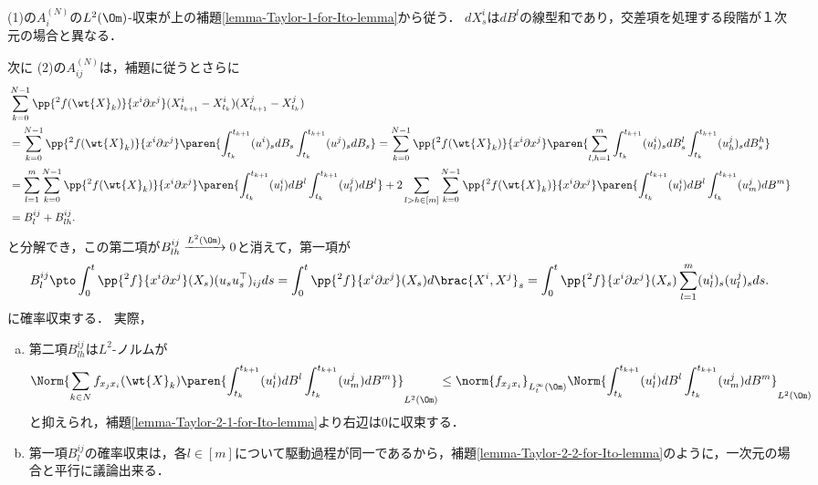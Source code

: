 \documentclass[uplatex,dvipdfmx]{jsreport}
\begin{document}
\begin{Proof}
\begin{description}
\begin{enumerate}
        \end{enumerate}
        \item[(1)の証明]
        (1)の$A^{(N)}_i$の$L^2(\Om)$-収束が上の補題\ref{lemma-Taylor-1-for-Ito-lemma}から従う．
        $dX_s^i$は$dB^l$の線型和であり，交差項を処理する段階が１次元の場合と異なる．
        \item[(2)の証明]
        次に
        (2)の$A^{(N)}_{ij}$は，補題に従うとさらに
        \begin{align*}
            &\sum_{k=0}^{N-1}\pp{^2f(\wt{X}_k)}{x^i\partial x^j}(X_{t_{k+1}}^i-X_{t_k}^i)(X_{t_{k+1}}^j-X_{t_k}^j)\\
            &=\sum_{k=0}^{N-1}\pp{^2f(\wt{X}_k)}{x^i\partial x^j}\paren{\int^{t_{k+1}}_{t_k}(u^i)_sdB_s\int^{t_{k+1}}_{t_k}(u^j)_sdB_s}
            =\sum_{k=0}^{N-1}\pp{^2f(\wt{X}_k)}{x^i\partial x^j}\paren{\sum_{l,h=1}^m\int^{t_{k+1}}_{t_k}(u^i_l)_sdB_s^l\int^{t_{k+1}}_{t_k}(u_h^j)_sdB_s^h}\\
            &=\sum_{l=1}^m\sum_{k=0}^{N-1}\pp{^2f(\wt{X}_k)}{x^i\partial x^j}\paren{\int^{t_{k+1}}_{t_k}(u_l^i)dB^l\int^{t_{k+1}}_{t_k}(u_l^j)dB^l}+2\sum_{l>h\in[m]}\sum_{k=0}^{N-1}\pp{^2f(\wt{X}_k)}{x^i\partial x^j}\paren{\int^{t_{k+1}}_{t_k}(u_l^i)dB^l\int^{t_{k+1}}_{t_k}(u_m^j)dB^m}\\
            &=B^{ij}_{l}+B^{ij}_{lh}.
        \end{align*}
        と分解でき，この第二項が$B^{ij}_{lh}\xrightarrow{L^2(\Om)}0$と消えて，第一項が
        \[B^{ij}_l\pto\int^t_0\pp{^2f}{x^i\partial x^j}(X_s)(u_su_s^\top)_{ij}ds=\int^t_0\pp{^2f}{x^i\partial x^j}(X_s)d\brac{X^i,X^j}_s=\int^t_0\pp{^2f}{x^i\partial x^j}(X_s)\sum_{l=1}^m(u^i_l)_s(u^j_l)_sds.\]
        に確率収束する．
        実際，
        \begin{enumerate}[(a)]
            \item 第二項$B^{ij}_{lh}$は$L^2$-ノルムが
            \[\Norm{\sum_{k\in N}f_{x_jx_i}(\wt{X}_k)\paren{\int^{t_{k+1}}_{t_k}(u_l^i)dB^l\int^{t_{k+1}}_{t_k}(u_m^j)dB^m}}_{L^2(\Om)}\le\norm{f_{x_jx_i}}_{L^\infty_t(\Om)}\Norm{\int^{t_{k+1}}_{t_k}(u_l^i)dB^l\int^{t_{k+1}}_{t_k}(u_m^j)dB^m}_{L^2(\Om)}\]
            と抑えられ，補題\ref{lemma-Taylor-2-1-for-Ito-lemma}より右辺は$0$に収束する．
            \item 第一項$B^{ij}_{l}$の確率収束は，各$l\in [m]$について駆動過程が同一であるから，補題\ref{lemma-Taylor-2-2-for-Ito-lemma}のように，一次元の場合と平行に議論出来る．
        \end{enumerate}
    \end{description}
\end{Proof}
\end{document}
